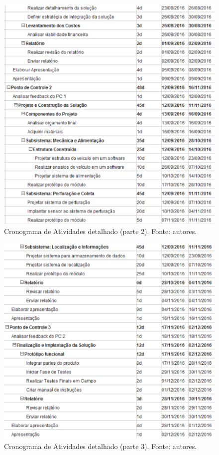 \begin{apendicesenv}
\begin{figure}[!htbp]
  \centering
  \includegraphics[width=\textwidth]{figuras/cronograma_det_2.eps}
  \caption{Cronograma de Atividades detalhado (parte 2). Fonte: autores.}
  \label{fig:cron_d2}
\end{figure}

\vfill
\pagebreak

\begin{figure}[!htbp]
  \centering
  \includegraphics[width=\textwidth]{figuras/cronograma_det_3.eps}
  \caption{Cronograma de Atividades detalhado (parte 3). Fonte: autores.}
  \label{fig:cron_d3}
\end{figure}


\end{apendicesenv}
